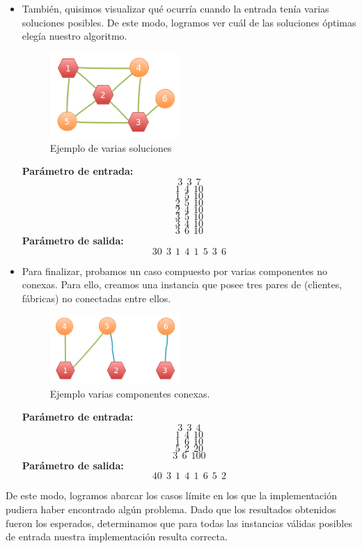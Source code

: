 \begin{itemize}
\item También, quisimos visualizar qué ocurría cuando la entrada tenía varias soluciones posibles. De este modo, logramos ver cuál de las soluciones óptimas elegía nuestro algoritmo.\newline
\begin{figure}[H] %
\begin{center}
\includegraphics[width=140pt]{../imgs/caso2-ej3.png}
\end{center}
\caption{Ejemplo de varias soluciones}
\end{figure}
\textbf{Parámetro de entrada:} $$3\ \  3\ \  7$$
$$1\ \  4\ \  10$$
$$1\ \  5\ \  10$$
$$2\ \ 5\ \  10$$
$$2\ \ 4\ \  10$$
$$3\ \  5\ \  10$$
$$3\ \  4\ \  10$$
$$3\ \  6\ \  10$$
\textbf{Parámetro de salida:} $$30\ \ 3\ \ 1\ \ 4\ \ 1\ \ 5\ \ 3\ \ 6$$

\item Para finalizar, probamos un caso compuesto por varias componentes no conexas. Para ello, creamos una instancia que posee tres pares de (clientes, fábricas) no conectadas entre ellos. \newline
\begin{figure}[H] %
\begin{center}
\includegraphics[width=140pt]{../imgs/caso4-ej3.png}
\end{center}
\caption{Ejemplo varias componentes conexas.}
\end{figure}
\textbf{Parámetro de entrada:} $$3\ \  3\ \  4$$
$$1\ \  4\ \  10$$
$$1\ \  6\ \  10$$
$$5\ \  2\ \  20$$
$$3\ \  6\ \  100$$																									
\textbf{Parámetro de salida:} $$40\ \ 3\ \ 1\ \ 4\ \ 1\ \ 6\ \ 5\ \ 2$$

\end{itemize}


De este modo, logramos abarcar los casos límite en los que la implementación pudiera haber encontrado algún problema. Dado que los resultados obtenidos fueron los esperados, determinamos que para todas las instancias válidas posibles de entrada nuestra implementación resulta correcta.


